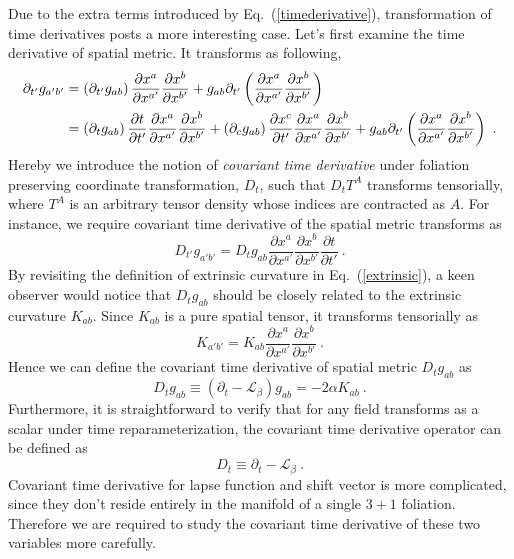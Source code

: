 Due to the extra terms introduced by Eq.~(\ref{timederivative}), transformation of time derivatives posts a more interesting case. Let's first examine the time derivative of spatial metric. It transforms as following, 
\begin{align}
\partial_{t'}g_{a'b'} & = \left(\partial_{t'}g_{ab}\right)\frac{\partial x^{a}}{\partial x^{a'}}\frac{\partial x^{b}}{\partial x^{b'}} + g_{ab}\partial_{t'}\left(\frac{\partial x^{a}}{\partial x^{a'}}\frac{\partial x^{b}}{\partial x^{b'}}\right)\notag\\
& =  \left(\partial_{t}g_{ab}\right)\frac{\partial t}{\partial t'}\frac{\partial x^{a}}{\partial x^{a'}}\frac{\partial x^{b}}{\partial x^{b'}} + \left(\partial_{c}g_{ab}\right)\frac{\partial x^{c}}{\partial t'}\frac{\partial x^{a}}{\partial x^{a'}}\frac{\partial x^{b}}{\partial x^{b'}} + g_{ab}\partial_{t'}\left(\frac{\partial x^{a}}{\partial x^{a'}}\frac{\partial x^{b}}{\partial x^{b'}}\right) \ .
\end{align}
Hereby we introduce the notion of {\em covariant time derivative} under foliation preserving coordinate transformation, $D_{t}$, such that $D_{t}T^{A}$ transforms tensorially, where $T^{A}$ is an arbitrary tensor density whose indices are contracted as $A$. For instance, we require covariant time derivative of the spatial metric transforms as
\begin{equation}
	D_{t'}g_{a'b'} = D_{t}g_{ab}\frac{\partial x^{a}}{\partial x^{a'}}\frac{\partial x^{b}}{\partial x^{b'}}\frac{\partial t}{\partial t'} \ .
\end{equation}
By revisiting the definition of extrinsic curvature in Eq.~(\ref{extrinsic}), a keen observer would notice that $D_{t}g_{ab}$ should be closely related to the extrinsic curvature $K_{ab}$. Since $K_{ab}$ is a pure spatial tensor, it transforms tensorially as
\begin{equation}
	K_{a'b'} = K_{ab}\frac{\partial x^{a}}{\partial x^{a'}}\frac{\partial x^{b}}{\partial x^{b'}} \ .
\end{equation}
Hence we can define the covariant time derivative of spatial metric $D_{t}g_{ab}$ as
\begin{equation}\label{spatialmetriccovarianttimederivative}
	D_{t}g_{ab} \equiv (\partial_{t} - \mathcal{L}_{\beta})g_{ab} = -2\alpha K_{ab} \ .
\end{equation}
Furthermore, it is straightforward to verify that for any field transforms as a scalar under time reparameterization, the covariant time derivative operator can be defined as
\begin{equation}
	D_{t} \equiv \partial_{t} - \mathcal{L}_{\beta} \ .
\end{equation}
Covariant time derivative for lapse function and shift vector is more complicated, since they don't reside entirely in the manifold of a single $3 + 1$ foliation. Therefore we are required to study the covariant time derivative of these two variables more carefully. 

